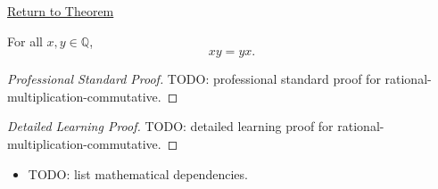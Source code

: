 \newpage
{}
\label{prf:rational-multiplication-commutative}

\begin{remark*}[Return]
\hyperref[thm:rational-multiplication-commutative]{Return to Theorem}
\end{remark*}

\begin{theorem*}
For all $x,y\in\mathbb{Q}$,
\[
xy=yx.
\]
\end{theorem*}

\begin{proof}[Professional Standard Proof]
\LRAProofBodyStart
TODO: professional standard proof for rational-multiplication-commutative.
\end{proof}

\begin{proof}[Detailed Learning Proof]
\LRAProofBodyStart
TODO: detailed learning proof for rational-multiplication-commutative.
\end{proof}

\begin{remark*}
\end{remark*}

\begin{dependencies}
\begin{itemize}
  \item TODO: list mathematical dependencies.
\end{itemize}
\end{dependencies}

\clearpage
